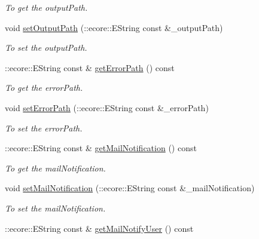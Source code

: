 \begin{DoxyCompactItemize}
\begin{DoxyCompactList}\small\item\em To get the outputPath. \item\end{DoxyCompactList}\item 
void \hyperlink{classTMS__Data_1_1SubmitOptions_a164e9073d5d42064d0a94b6c442db2bd}{setOutputPath} (::ecore::EString const \&\_\-outputPath)
\begin{DoxyCompactList}\small\item\em To set the outputPath. \item\end{DoxyCompactList}\item 
::ecore::EString const \& \hyperlink{classTMS__Data_1_1SubmitOptions_a2db7c8063f91b11aecf38954e20bc44b}{getErrorPath} () const 
\begin{DoxyCompactList}\small\item\em To get the errorPath. \item\end{DoxyCompactList}\item 
void \hyperlink{classTMS__Data_1_1SubmitOptions_ae4dde2ccc640defccae8d92ca184c4d6}{setErrorPath} (::ecore::EString const \&\_\-errorPath)
\begin{DoxyCompactList}\small\item\em To set the errorPath. \item\end{DoxyCompactList}\item 
::ecore::EString const \& \hyperlink{classTMS__Data_1_1SubmitOptions_a47d52fed5343b27dd54e974c8fca8701}{getMailNotification} () const 
\begin{DoxyCompactList}\small\item\em To get the mailNotification. \item\end{DoxyCompactList}\item 
void \hyperlink{classTMS__Data_1_1SubmitOptions_a535d000c1ffdebd407fcf030d1ae9faf}{setMailNotification} (::ecore::EString const \&\_\-mailNotification)
\begin{DoxyCompactList}\small\item\em To set the mailNotification. \item\end{DoxyCompactList}\item 
::ecore::EString const \& \hyperlink{classTMS__Data_1_1SubmitOptions_aad55ca0887d661f2b462231d88f48163}{getMailNotifyUser} () const 

\end{DoxyCompactItemize}
